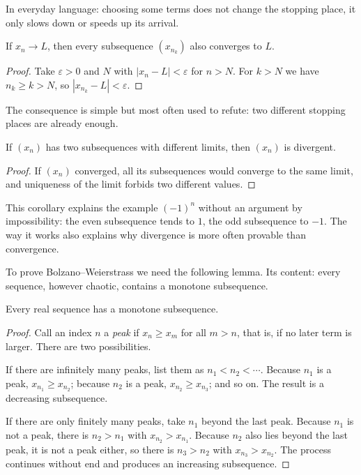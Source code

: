 In everyday language: choosing some terms does not change the stopping place, it only
slows down or speeds up its arrival.

\begin{proposisi}
If $x_n \to L$, then every subsequence $(x_{n_k})$ also converges to $L$.
\end{proposisi}

\begin{proof}
Take $\varepsilon>0$ and $N$ with $|x_n-L|<\varepsilon$ for $n>N$. For $k>N$ we have
$n_k \ge k>N$, so $|x_{n_k}-L|<\varepsilon$.
\end{proof}

The consequence is simple but most often used to refute: two different stopping places
are already enough.

\begin{akibat}
If $(x_n)$ has two subsequences with different limits, then $(x_n)$ is divergent.
\end{akibat}

\begin{proof}
If $(x_n)$ converged, all its subsequences would converge to the same limit, and
uniqueness of the limit forbids two different values.
\end{proof}

This corollary explains the example $(-1)^n$ without an argument by impossibility: the
even subsequence tends to $1$, the odd subsequence to $-1$. The way it works also
explains why divergence is more often provable than convergence.

To prove Bolzano--Weierstrass we need the following lemma. Its content: every
sequence, however chaotic, contains a monotone subsequence.

\begin{lemma}
Every real sequence has a monotone subsequence.
\end{lemma}

\begin{proof}
Call an index $n$ a \emph{peak} if $x_n \ge x_m$ for all $m>n$, that is, if no later
term is larger. There are two possibilities.

If there are infinitely many peaks, list them as $n_1<n_2<\cdots$. Because $n_1$ is a
peak, $x_{n_1} \ge x_{n_2}$; because $n_2$ is a peak, $x_{n_2} \ge x_{n_3}$; and so
on. The result is a decreasing subsequence.

If there are only finitely many peaks, take $n_1$ beyond the last peak. Because $n_1$
is not a peak, there is $n_2>n_1$ with $x_{n_2}>x_{n_1}$. Because $n_2$ also lies
beyond the last peak, it is not a peak either, so there is $n_3>n_2$ with
$x_{n_3}>x_{n_2}$. The process continues without end and produces an increasing
subsequence.
\end{proof}

